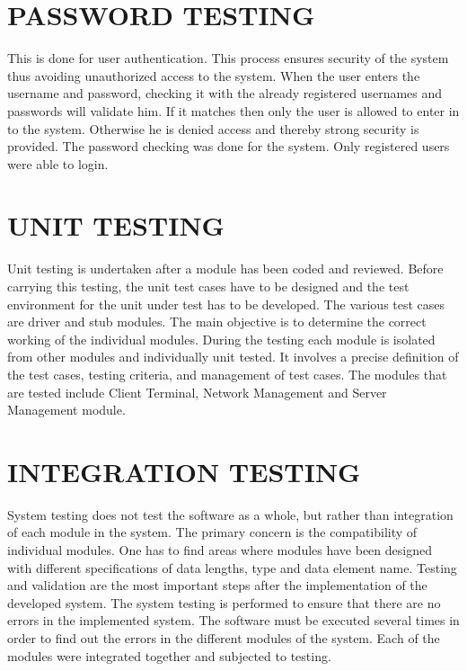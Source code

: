 \documentclass[12pt,a4paper,oneside]{report}
\begin{document}
\section{PASSWORD TESTING}
\par This is done for user authentication. This process ensures security of the system thus avoiding unauthorized access to the system. When the user enters the username and password, checking it with the already registered usernames and passwords will validate him. If it matches then only the user is allowed to enter in to the system. Otherwise he is denied access and thereby strong security is provided. The password checking was done for the system. Only registered users were able to login.
\section{UNIT TESTING}
Unit testing is undertaken after a module has been coded and reviewed. Before carrying this testing, the unit test cases have to be designed and the test environment for the unit under test has to be developed. The various test cases are driver and stub modules. The main objective is to determine the correct working of the individual modules. During the testing each module is isolated from other modules and individually unit tested. It involves a precise definition of the test cases, testing criteria, and management of test cases. The modules that are tested include Client Terminal, Network Management and Server Management module.
 \section{INTEGRATION TESTING}
System testing does not test the software as a whole, but rather than integration of each module in the system. The primary concern is the compatibility of individual modules. One has to find areas where modules have been designed with different specifications of data lengths, type and data element name. Testing and validation are the most important steps after the implementation of the developed system. The system testing is performed to ensure that there are no errors in the implemented system. The software must be executed several times in order to find out the errors in the different modules of the system. Each of the modules were integrated together and subjected to testing.
\end{document}
